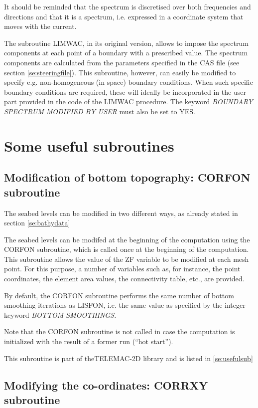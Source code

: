  It should be reminded that the spectrum is discretised over both frequencies and directions and that it is a  spectrum, i.e. expressed in a coordinate system that moves with the current.

 The subroutine LIMWAC, in its original version, allows to impose the spectrum components at each point of a boundary with a prescribed value. The spectrum components are calculated from the parameters specified in the CAS file (see section \ref{se:steeringfile}). This subroutine, however, can easily be modified to specify e.g. non-homogeneous (in space) boundary conditions. When such specific boundary conditions are required, these will ideally be incorporated in the user part provided in the code of the LIMWAC procedure. The keyword \textit{BOUNDARY SPECTRUM MODIFIED BY USER} must also be set to YES.


\section{ Some useful subroutines}


\subsection{ Modification of bottom topography: CORFON subroutine}
\label{se:corfon}
 The seabed levels can be modified in two different ways, as already stated in section \ref{se:bathydata}

 The seabed levels can be modifed at the beginning of the computation using the CORFON subroutine, which is called once at the beginning of the computation. This subroutine allows the value of the ZF variable to be modified at each mesh point. For this purpose, a number of variables such as, for instance, the point coordinates, the element area values, the connectivity table, etc., are provided.

 By default, the CORFON subroutine performs the same number of bottom smoothing iterations as LISFON, i.e. the same value as specified by the integer keyword \textit{BOTTOM SMOOTHINGS.}

 Note that the CORFON subroutine is not called in case the computation is initialized with the result of a former \tomawac run (``hot start'').

 This subroutine is part of theTELEMAC-2D library and is listed in \ref{se:usefulsub}


\subsection{ Modifying the co-ordinates: CORRXY subroutine }

